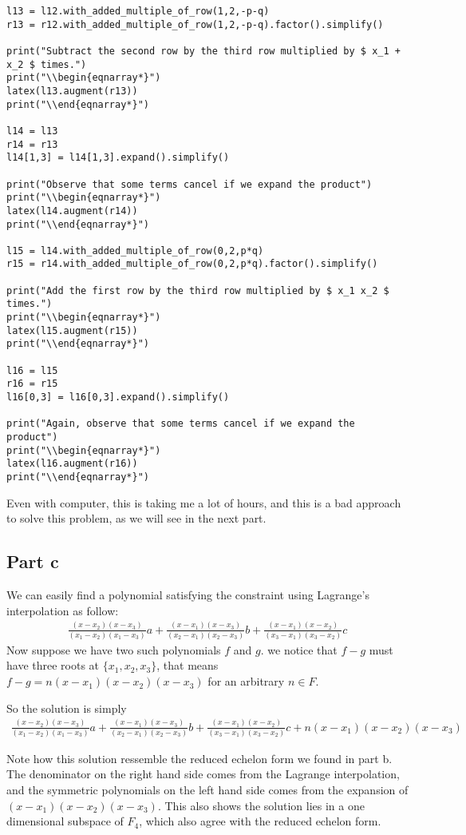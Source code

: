 \begin{verbatim}
l13 = l12.with_added_multiple_of_row(1,2,-p-q)
r13 = r12.with_added_multiple_of_row(1,2,-p-q).factor().simplify()

print("Subtract the second row by the third row multiplied by $ x_1 + x_2 $ times.")
print("\\begin{eqnarray*}")
latex(l13.augment(r13))
print("\\end{eqnarray*}")

l14 = l13
r14 = r13
l14[1,3] = l14[1,3].expand().simplify()

print("Observe that some terms cancel if we expand the product")
print("\\begin{eqnarray*}")
latex(l14.augment(r14))
print("\\end{eqnarray*}")

l15 = l14.with_added_multiple_of_row(0,2,p*q)
r15 = r14.with_added_multiple_of_row(0,2,p*q).factor().simplify()

print("Add the first row by the third row multiplied by $ x_1 x_2 $ times.")
print("\\begin{eqnarray*}")
latex(l15.augment(r15))
print("\\end{eqnarray*}")

l16 = l15
r16 = r15
l16[0,3] = l16[0,3].expand().simplify()

print("Again, observe that some terms cancel if we expand the product")
print("\\begin{eqnarray*}")
latex(l16.augment(r16))
print("\\end{eqnarray*}")
\end{verbatim}
Even with computer, this is taking me a lot of hours, and this is a bad approach to solve this problem, as we will see in the next part.
\subsection*{Part c}
We can easily find a polynomial satisfying the constraint using Lagrange's interpolation as follow:
\begin{eqnarray*}
    \frac{(x - x_2)(x - x_3)}{(x_1 - x_2)(x_1 - x_3)} a + \frac{(x - x_1)(x - x_3)}{(x_2 - x_1)(x_2 - x_3)} b + \frac{(x - x_1)(x - x_2)}{(x_3 - x_1)(x_3 - x_2)} c
\end{eqnarray*}
Now suppose we have two such polynomials $ f $ and $ g $. we notice that $ f - g $ must have three roots at $ \{ x_1, x_2, x_3\} $, that means $ f - g = n(x - x_1)(x-x_2)(x - x_3) $ for an arbitrary $ n \in F $.

So the solution is simply 
\begin{eqnarray*}
    \frac{(x - x_2)(x - x_3)}{(x_1 - x_2)(x_1 - x_3)} a + \frac{(x - x_1)(x - x_3)}{(x_2 - x_1)(x_2 - x_3)} b + \frac{(x - x_1)(x - x_2)}{(x_3 - x_1)(x_3 - x_2)} c + n(x - x_1)(x-x_2)(x - x_3)
\end{eqnarray*}

Note how this solution ressemble the reduced echelon form we found in part b. The denominator on the right hand side comes from the Lagrange interpolation, and the symmetric polynomials on the left hand side comes from the expansion of  $ (x - x_1)(x-x_2)(x - x_3) $. This also shows the solution lies in a one dimensional subspace of $ F_4 $, which also agree with the reduced echelon form.